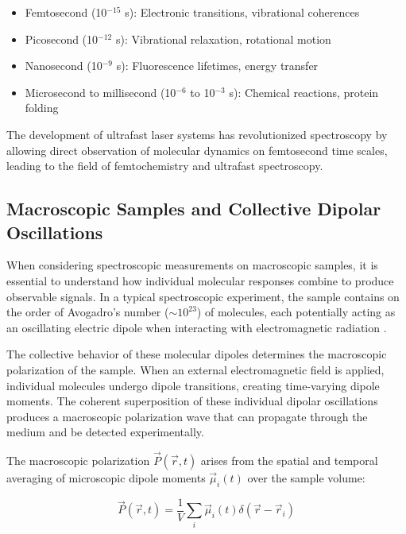 \begin{itemize}
	\item Femtosecond (10$^{-15}$ s): Electronic transitions, vibrational coherences
	\item Picosecond (10$^{-12}$ s): Vibrational relaxation, rotational motion
	\item Nanosecond (10$^{-9}$ s): Fluorescence lifetimes, energy transfer
	\item Microsecond to millisecond (10$^{-6}$ to 10$^{-3}$ s): Chemical reactions, protein folding
\end{itemize}

\noindent The development of ultrafast laser systems has revolutionized spectroscopy by allowing direct observation of molecular dynamics on femtosecond time scales, leading to the field of femtochemistry and ultrafast spectroscopy.

\subsection{Macroscopic Samples and Collective Dipolar Oscillations}
\label{subsec:macroscopic_samples}

\noindent When considering spectroscopic measurements on macroscopic samples, it is essential to understand how individual molecular responses combine to produce observable signals. In a typical spectroscopic experiment, the sample contains on the order of Avogadro's number ($\sim 10^{23}$) of molecules, each potentially acting as an oscillating electric dipole when interacting with electromagnetic radiation \cite{feynman1965feynmanlecturesphysics}.

\noindent The collective behavior of these molecular dipoles determines the macroscopic polarization of the sample. When an external electromagnetic field is applied, individual molecules undergo dipole transitions, creating time-varying dipole moments. The coherent superposition of these individual dipolar oscillations produces a macroscopic polarization wave that can propagate through the medium and be detected experimentally.

\noindent The macroscopic polarization $\vec{P}(\vec{r}, t)$ arises from the spatial and temporal averaging of microscopic dipole moments $\vec{\mu}_i(t)$ over the sample volume:

\begin{equation}
	\vec{P}(\vec{r}, t) = \frac{1}{V} \sum_{i} \vec{\mu}_i(t) \delta(\vec{r} - \vec{r}_i)
	\label{eq:macroscopic_polarization}
\end{equation}

